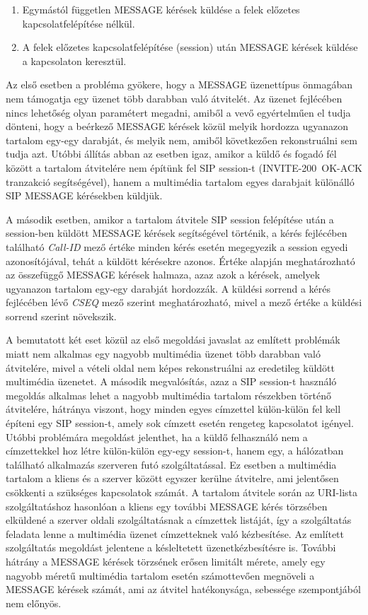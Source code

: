 \begin{enumerate}\itemsep1pt
\item	Egymástól független MESSAGE kérések küldése a felek előzetes kapcsolatfelépítése nélkül.
\item A felek előzetes kapcsolatfelépítése (session) után MESSAGE kérések küldése a kapcsolaton keresztül. 
\end{enumerate}

Az első esetben a probléma gyökere, hogy a MESSAGE üzenettípus önmagában nem támogatja egy üzenet több darabban való átvitelét. Az üzenet fejlécében nincs lehetőség olyan paramétert megadni, amiből a vevő egyértelműen el tudja dönteni, hogy a beérkező MESSAGE kérések közül melyik hordozza ugyanazon tartalom egy-egy darabját, és melyik nem, amiből következően rekonstruálni sem tudja azt. Utóbbi állítás abban az esetben igaz, amikor a küldő és fogadó fél között a tartalom átvitelére nem építünk fel SIP session-t (INVITE-200~OK-ACK tranzakció segítségével), hanem a multimédia tartalom egyes darabjait különálló SIP MESSAGE kérésekben küldjük. 

A második esetben, amikor a tartalom átvitele SIP session felépítése után a session-ben küldött MESSAGE kérések segítségével történik, a kérés fejlécében található \emph{Call-ID} mező értéke minden kérés esetén megegyezik a session egyedi azonosítójával, tehát a küldött kérésekre azonos. Értéke alapján meghatározható az összefüggő MESSAGE kérések halmaza, azaz azok a kérések, amelyek ugyanazon tartalom egy-egy darabját hordozzák. A küldési sorrend a kérés fejlécében lévő \emph{CSEQ} mező szerint meghatározható, mivel a mező értéke a küldési sorrend szerint növekszik. 

A bemutatott két eset közül az első megoldási javaslat az említett problémák miatt nem alkalmas egy nagyobb multimédia üzenet több darabban való átvitelére, mivel a vételi oldal nem képes rekonstruálni az eredetileg küldött multimédia üzenetet. A második megvalósítás, azaz a SIP session-t használó megoldás alkalmas lehet a nagyobb multimédia tartalom részekben történő átvitelére, hátránya viszont, hogy minden egyes címzettel külön-külön fel kell építeni egy SIP session-t, amely sok címzett esetén rengeteg kapcsolatot igényel. Utóbbi problémára megoldást jelenthet, ha a küldő felhasználó nem a címzettekkel hoz létre külön-külön egy-egy session-t, hanem egy, a hálózatban található alkalmazás szerveren futó szolgáltatással. Ez esetben a multimédia tartalom a kliens és a szerver között egyszer kerülne átvitelre, ami jelentősen csökkenti a szükséges kapcsolatok számát. A tartalom átvitele során az URI-lista szolgáltatáshoz hasonlóan a kliens egy további MESSAGE kérés törzsében elküldené a szerver oldali szolgáltatásnak a címzettek listáját, így a szolgáltatás feladata lenne a multimédia üzenet címzetteknek való kézbesítése. Az említett szolgáltatás megoldást jelentene a késleltetett üzenetkézbesítésre is. További hátrány a MESSAGE kérések törzsének erősen limitált mérete, amely egy nagyobb méretű multimédia tartalom esetén számottevően megnöveli a MESSAGE kérések számát, ami az átvitel hatékonysága, sebessége szempontjából nem előnyös.

